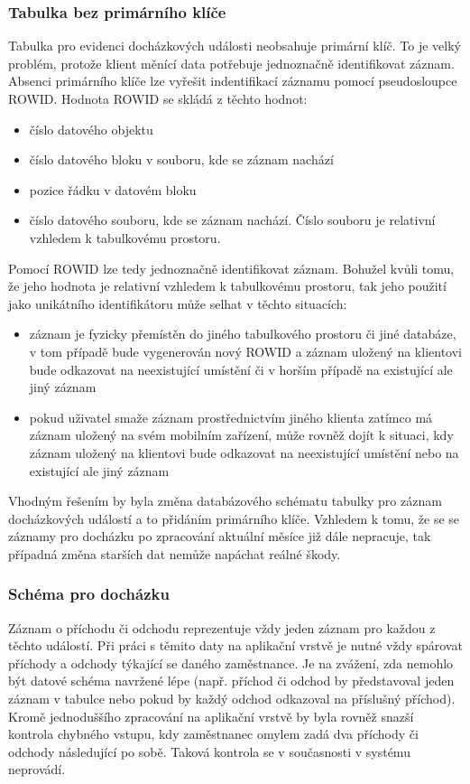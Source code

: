 \documentclass{diplomka}
\begin{document}
\subsubsection*{Tabulka bez primárního klíče}
Tabulka pro evidenci docházkových události neobsahuje primární klíč. To je velký problém, protože klient měnící data potřebuje jednoznačně identifikovat záznam. Absenci primárního klíče lze vyřešit indentifikací záznamu pomocí pseudosloupce ROWID. Hodnota ROWID se skládá z těchto hodnot:
\begin{itemize}[noitemsep,nolistsep]
\item číslo datového objektu 
\item číslo datového bloku v souboru, kde se záznam nachází
\item pozice řádku v datovém bloku 
\item číslo datového souboru, kde se záznam nachází. Číslo souboru je relativní vzhledem k tabulkovému prostoru.
\end{itemize}
Pomocí ROWID lze tedy jednoznačně identifikovat záznam. Bohužel kvůli tomu, že jeho hodnota je relativní vzhledem k tabulkovému prostoru, tak jeho použití jako unikátního identifikátoru může selhat v těchto situacích:
\begin{itemize}[noitemsep,nolistsep]
\item záznam je fyzicky přemístěn do jiného tabulkového prostoru či jiné databáze, v tom případě bude vygenerován nový ROWID a záznam uložený na klientovi bude odkazovat na neexistující umístění či v horším případě na existující ale jiný záznam
\item pokud uživatel smaže záznam prostřednictvím jiného klienta zatímco má záznam uložený na svém mobilním zařízení, může rovněž dojít k situaci, kdy záznam uložený na klientovi bude odkazovat na neexistující umístění nebo na existující ale jiný záznam 
\end{itemize}

Vhodným řešením by byla změna databázového schématu tabulky pro záznam docházkových událostí a to přidáním primárního klíče. Vzhledem k tomu, že se se záznamy pro docházku po zpracování aktuální měsíce již dále nepracuje, tak případná změna starších dat nemůže napáchat reálné škody. 
\subsubsection*{Schéma pro docházku}
Záznam o příchodu či odchodu reprezentuje vždy jeden záznam pro každou z těchto událostí. Při práci s těmito daty na aplikační vrstvě je nutné vždy spárovat příchody a odchody týkající se daného zaměstnance. Je na zvážení, zda nemohlo být datové schéma navržené lépe (např. příchod či odchod by představoval jeden záznam v tabulce nebo pokud by každý odchod odkazoval na příslušný příchod). Kromě jednoduššího zpracování na aplikační vrstvě by byla rovněž snazší kontrola chybného vstupu, kdy zaměstnanec omylem zadá dva příchody či odchody následující po sobě. Taková kontrola se v současnosti v systému neprovádí.
\end{document}

